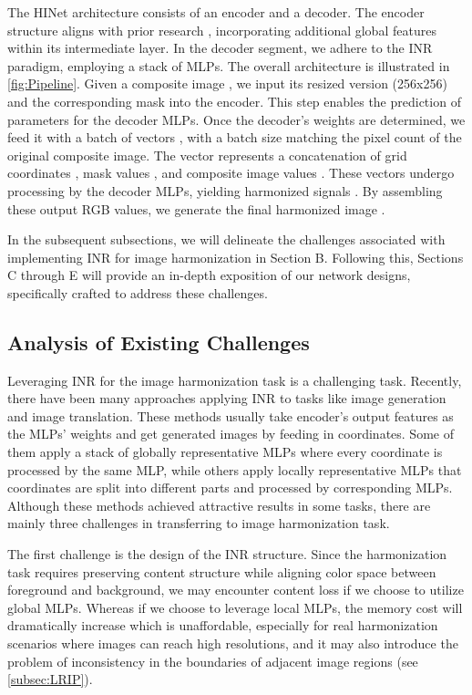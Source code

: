\documentclass[10pt,journal,twocolumn,twoside]{IEEEtran}
\begin{document}
The HINet architecture consists of an encoder and a decoder. The encoder structure aligns with prior research \cite{sofiiuk2021foreground, xue2022dccf}, incorporating additional global features within its intermediate layer. In the decoder segment, we adhere to the INR paradigm, employing a stack of MLPs. The overall architecture is illustrated in \cref{fig:Pipeline}. Given a composite image , we input its resized version (256x256) and the corresponding mask  into the encoder. This step enables the prediction of parameters for the decoder MLPs. Once the decoder's weights are determined, we feed it with a batch of vectors , with a batch size matching the pixel count of the original composite image. The vector  represents a concatenation of grid coordinates , mask values , and composite image values . These vectors undergo processing by the decoder MLPs, yielding harmonized signals . By assembling these output RGB values, we generate the final harmonized image .

In the subsequent subsections, we will delineate the challenges associated with implementing INR for image harmonization in Section B. Following this, Sections C through E will provide an in-depth exposition of our network designs, specifically crafted to address these challenges.

\subsection{Analysis of Existing Challenges}
\label{subsec:analysis}

Leveraging INR for the image harmonization task is a challenging task. Recently, there have been many approaches\cite{anokhin2021image, skorokhodov2021adversarial, karras2021alias, shaham2021spatially} applying INR to tasks like image generation and image translation. These methods usually take encoder's output features as the MLPs' weights and get generated images by feeding in coordinates. Some of them apply a stack of globally representative MLPs \cite{anokhin2021image} where every coordinate is processed by the same MLP, while others apply locally representative MLPs\cite{shaham2021spatially} that coordinates are split into different parts and processed by corresponding MLPs. Although these methods achieved attractive results in some tasks, there are mainly three challenges in transferring to image harmonization task.

The first challenge is the design of the INR structure. Since the harmonization task requires preserving content structure while aligning color space between foreground and background, we may encounter content loss \cite{shaham2021spatially} if we choose to utilize global MLPs. Whereas if we choose to leverage local MLPs, the memory cost will dramatically increase which is unaffordable, especially for real harmonization scenarios where images can reach high resolutions, and it may also introduce the problem of inconsistency in the boundaries of adjacent image regions (see \cref{subsec:LRIP}).
\end{document}
